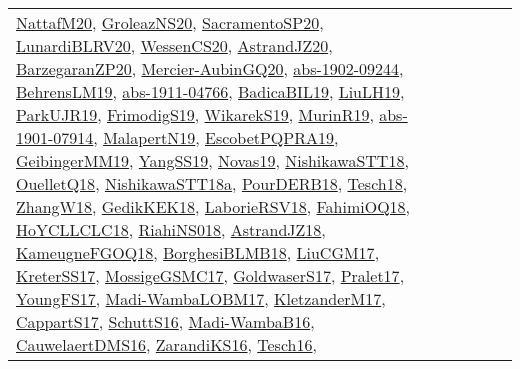 {\begin{longtable}{lp{3cm}>{\raggedright}p{6cm}>{\raggedright}p{6cm}p{8cm}}
\href{papers/NattafM20.pdf}{NattafM20}\cite{NattafM20}, \href{papers/GroleazNS20.pdf}{GroleazNS20}\cite{GroleazNS20}, \href{articles/SacramentoSP20.pdf}{SacramentoSP20}\cite{SacramentoSP20}, \href{articles/LunardiBLRV20.pdf}{LunardiBLRV20}\cite{LunardiBLRV20}, \href{papers/WessenCS20.pdf}{WessenCS20}\cite{WessenCS20}, \href{articles/AstrandJZ20.pdf}{AstrandJZ20}\cite{AstrandJZ20}, \href{papers/BarzegaranZP20.pdf}{BarzegaranZP20}\cite{BarzegaranZP20}, \href{papers/Mercier-AubinGQ20.pdf}{Mercier-AubinGQ20}\cite{Mercier-AubinGQ20}, \href{articles/abs-1902-09244.pdf}{abs-1902-09244}\cite{abs-1902-09244}, \href{papers/BehrensLM19.pdf}{BehrensLM19}\cite{BehrensLM19}, \href{articles/abs-1911-04766.pdf}{abs-1911-04766}\cite{abs-1911-04766}, \href{papers/BadicaBIL19.pdf}{BadicaBIL19}\cite{BadicaBIL19}, \href{papers/LiuLH19.pdf}{LiuLH19}\cite{LiuLH19}, \href{papers/ParkUJR19.pdf}{ParkUJR19}\cite{ParkUJR19}, \href{papers/FrimodigS19.pdf}{FrimodigS19}\cite{FrimodigS19}, \href{articles/WikarekS19.pdf}{WikarekS19}\cite{WikarekS19}, \href{papers/MurinR19.pdf}{MurinR19}\cite{MurinR19}, \href{articles/abs-1901-07914.pdf}{abs-1901-07914}\cite{abs-1901-07914}, \href{papers/MalapertN19.pdf}{MalapertN19}\cite{MalapertN19}, \href{articles/EscobetPQPRA19.pdf}{EscobetPQPRA19}\cite{EscobetPQPRA19}, \href{papers/GeibingerMM19.pdf}{GeibingerMM19}\cite{GeibingerMM19}, \href{papers/YangSS19.pdf}{YangSS19}\cite{YangSS19}, \href{articles/Novas19.pdf}{Novas19}\cite{Novas19}, \href{papers/NishikawaSTT18.pdf}{NishikawaSTT18}\cite{NishikawaSTT18}, \href{papers/OuelletQ18.pdf}{OuelletQ18}\cite{OuelletQ18}, \href{papers/NishikawaSTT18a.pdf}{NishikawaSTT18a}\cite{NishikawaSTT18a}, \href{articles/PourDERB18.pdf}{PourDERB18}\cite{PourDERB18}, \href{papers/Tesch18.pdf}{Tesch18}\cite{Tesch18}, \href{articles/ZhangW18.pdf}{ZhangW18}\cite{ZhangW18}, \href{articles/GedikKEK18.pdf}{GedikKEK18}\cite{GedikKEK18}, \href{articles/LaborieRSV18.pdf}{LaborieRSV18}\cite{LaborieRSV18}, \href{articles/FahimiOQ18.pdf}{FahimiOQ18}\cite{FahimiOQ18}, \href{papers/HoYCLLCLC18.pdf}{HoYCLLCLC18}\cite{HoYCLLCLC18}, \href{papers/RiahiNS018.pdf}{RiahiNS018}\cite{RiahiNS018}, \href{papers/AstrandJZ18.pdf}{AstrandJZ18}\cite{AstrandJZ18}, \href{papers/KameugneFGOQ18.pdf}{KameugneFGOQ18}\cite{KameugneFGOQ18}, \href{articles/BorghesiBLMB18.pdf}{BorghesiBLMB18}\cite{BorghesiBLMB18}, \href{papers/LiuCGM17.pdf}{LiuCGM17}\cite{LiuCGM17}, \href{articles/KreterSS17.pdf}{KreterSS17}\cite{KreterSS17}, \href{papers/MossigeGSMC17.pdf}{MossigeGSMC17}\cite{MossigeGSMC17}, \href{papers/GoldwaserS17.pdf}{GoldwaserS17}\cite{GoldwaserS17}, \href{papers/Pralet17.pdf}{Pralet17}\cite{Pralet17}, \href{papers/YoungFS17.pdf}{YoungFS17}\cite{YoungFS17}, \href{papers/Madi-WambaLOBM17.pdf}{Madi-WambaLOBM17}\cite{Madi-WambaLOBM17}, \href{papers/KletzanderM17.pdf}{KletzanderM17}\cite{KletzanderM17}, \href{papers/CappartS17.pdf}{CappartS17}\cite{CappartS17}, \href{papers/SchuttS16.pdf}{SchuttS16}\cite{SchuttS16}, \href{papers/Madi-WambaB16.pdf}{Madi-WambaB16}\cite{Madi-WambaB16}, \href{papers/CauwelaertDMS16.pdf}{CauwelaertDMS16}\cite{CauwelaertDMS16}, \href{articles/ZarandiKS16.pdf}{ZarandiKS16}\cite{ZarandiKS16}, \href{papers/Tesch16.pdf}{Tesch16}\cite{Tesch16}, 
\end{longtable}}

